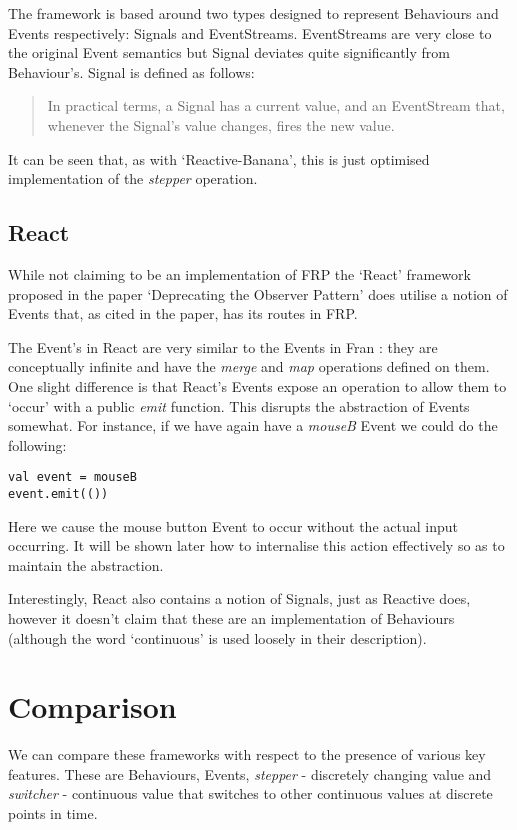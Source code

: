       The framework is based around two types designed to represent Behaviours and Events respectively: Signals
      and EventStreams. EventStreams are very close to the original Event semantics but Signal deviates quite significantly 
      from Behaviour's. Signal is defined as follows:

      \begin{quote}
        In practical terms, a Signal has a current value, and an EventStream that, whenever the Signal's value changes,     
        fires the new value.
      \end{quote}  
      
      It can be seen that, as with `Reactive-Banana', this is just optimised implementation of the \emph{stepper}
      operation.

    \subsection{React}
      While not claiming to be an implementation of FRP the `React' framework proposed in the 
      paper `Deprecating the Observer Pattern' \cite{Maier2010} does utilise a notion of Events that, as cited in the paper,
      has its routes in FRP.

      The Event's in React are very similar to the Events in Fran \cite{Elliott1997}: they are conceptually infinite
      and have the \emph{merge} and \emph{map} operations defined on them. One slight difference is that React's
      Events expose an operation to allow them to `occur' with a public \emph{emit} function. This disrupts
      the abstraction of Events somewhat. For instance, if we have again have a \emph{mouseB} Event we could do the following:

\begin{verbatim}
val event = mouseB
event.emit(())
\end{verbatim}      

      Here we cause the mouse button Event to occur without the actual input occurring. It will be shown later how to     
      internalise this action effectively so as to maintain the abstraction. 

      Interestingly, React also contains a notion of Signals, just as Reactive does, 
      however it doesn't claim that these are an implementation of Behaviours (although the word `continuous' is
      used loosely in their description). 
      
\section{Comparison}
  We can compare these frameworks with respect to the presence of various key features. These are Behaviours, Events, 
  \emph{stepper} - discretely 
  changing value and \emph{switcher} - continuous value that switches to other continuous values at discrete points in time.
  
